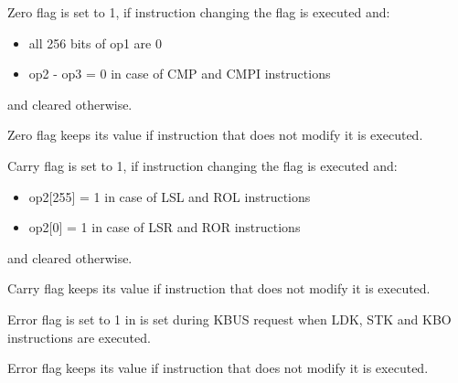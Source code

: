 \documentclass{tropic_design_spec}
\begin{document}


Zero flag is set to 1, if instruction changing the flag is executed and:
\begin{itemize}
    \item all 256 bits of op1 are 0
    \item op2 - op3 = 0 in case of CMP and CMPI instructions
\end{itemize}
and cleared otherwise.

Zero flag keeps its value if instruction that does not modify it is executed.


Carry flag is set to 1, if instruction changing the flag is executed and:
\begin{itemize}
    \item op2[255] = 1 in case of LSL and ROL instructions
    \item op2[0] = 1 in case of LSR and ROR instructions
\end{itemize}
and cleared otherwise.

Carry flag keeps its value if instruction that does not modify it is executed.


Error flag is set to 1 in  is set during KBUS request
when LDK, STK and KBO instructions are executed.

Error flag keeps its value if instruction that does not modify it is executed.
\end{document}
